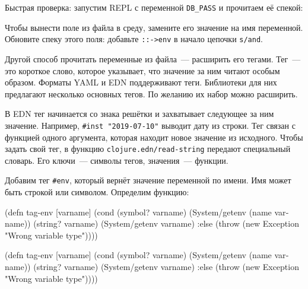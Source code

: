 Быстрая проверка: запустим REPL с переменной \verb|DB_PASS| и прочитаем её
спекой:

\begin{english}
\end{english}

Чтобы вынести поле из файла в среду, замените его значение на имя
переменной. Обновите спеку этого поля: добавьте \verb|::->env| в начало цепочки
\verb|s/and|.


Другой способ прочитать переменные из файла~--- расширить его тегами. Тег~---
это короткое слово, которое указывает, что значение за ним читают особым
образом. Форматы YAML и EDN поддерживают теги. Библиотеки для них предлагают
несколько основных тегов. По желанию их набор можно расширить.


В EDN тег начинается со знака решётки и захватывает следующее за ним
значение. Например, \verb|#inst "2019-07-10"| выводит дату из строки. Тег связан
с функцией одного аргумента, которая находит новое значение из исходного. Чтобы
задать свой тег, в функцию \verb|clojure.edn/read-string| передают специальный
словарь. Его ключи~--- символы тегов, значения~--- функции.

\label{tag-env}

Добавим тег \verb|#env|, который вернёт значение переменной по имени. Имя
может быть строкой или символом. Определим функцию:

\ifnarrow

\begin{english}
  \begin{clojure}
(defn tag-env
  [varname]
  (cond
    (symbol? varname)
    (System/getenv (name varname))
    (string? varname)
    (System/getenv varname)
    :else
    (throw
      (new Exception
        "Wrong variable type"))))
  \end{clojure}
\end{english}

\else

\begin{english}
  \begin{clojure}
(defn tag-env
  [varname]
  (cond
    (symbol? varname)
    (System/getenv (name varname))
    (string? varname)
    (System/getenv varname)
    :else
    (throw (new Exception "Wrong variable type"))))
  \end{clojure}
\end{english}

